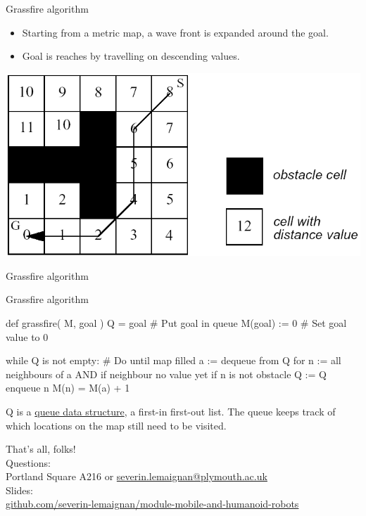 \documentclass[compress]{beamer}
\begin{document}
\begin{frame}{Grassfire algorithm}

\begin{itemize}
\item Starting from a metric map, a wave front is expanded around the goal.
\item Goal is reaches by travelling on descending values.
\end{itemize}

    \begin{center}
        \includegraphics[width=0.6\linewidth]{grassfire}
    \end{center}
\end{frame}

\begin{frame}{Grassfire algorithm}

\end{frame}


\begin{frame}[fragile]{Grassfire algorithm}

\begin{pythoncode}

def grassfire( M, goal )
  Q = goal # Put goal in queue
  M(goal) := 0 # Set goal value to 0

  while Q is not empty: # Do until map filled
    a := dequeue from Q
    for n := all neighbours of a AND if neighbour no value yet
      if n is not obstacle
        Q := Q enqueue n
        M(n) = M(a) + 1
\end{pythoncode}

Q is a
\href{http://en.wikipedia.org/wiki/Queue_(abstract_data_type)}{queue
data structure}, a first-in first-out list. The queue keeps track of
which locations on the map still need to be visited.

\end{frame}


\begin{frame}{}
    \begin{center}
        \Large
        That's all, folks!\\[2em]
        \normalsize
        Questions:\\
        Portland Square A216 or \url{severin.lemaignan@plymouth.ac.uk} \\[1em]

        Slides:\\ \href{https://github.com/severin-lemaignan/module-mobile-and-humanoid-robots}{\small github.com/severin-lemaignan/module-mobile-and-humanoid-robots}

    \end{center}
\end{frame}
\end{document}

